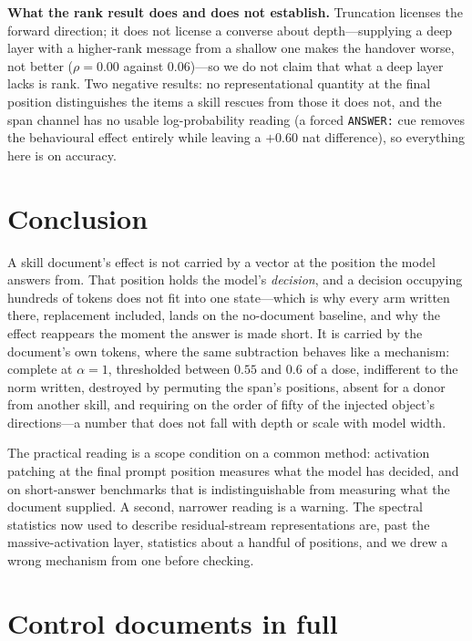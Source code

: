 \documentclass{article}
\begin{document}
\textbf{What the rank result does and does not establish.} Truncation licenses
the forward direction; it does not license a converse about depth---supplying a
deep layer with a higher-rank message from a shallow one makes the handover
worse, not better ($\rho=0.00$ against $0.06$)---so we do not claim that what a
deep layer lacks is rank. Two negative results: no representational quantity at
the final position distinguishes the items a skill rescues from those it does
not, and the span channel has no usable log-probability reading (a forced
\texttt{ANSWER:} cue removes the behavioural effect entirely while leaving a
$+0.60$ nat difference), so everything here is on accuracy.

\section{Conclusion}

A skill document's effect is not carried by a vector at the position the model
answers from. That position holds the model's \emph{decision}, and a decision
occupying hundreds of tokens does not fit into one state---which is why every
arm written there, replacement included, lands on the no-document baseline, and
why the effect reappears the moment the answer is made short. It is carried by
the document's own tokens, where the same subtraction behaves like a mechanism:
complete at $\alpha=1$, thresholded between $0.55$ and $0.6$ of a dose,
indifferent to the norm written, destroyed by permuting the span's positions,
absent for a donor from another skill, and requiring on the order of fifty of
the injected object's directions---a number that does not fall with depth or
scale with model width.

The practical reading is a scope condition on a common method: activation
patching at the final prompt position measures what the model has decided, and
on short-answer benchmarks that is indistinguishable from measuring what the
document supplied. A second, narrower reading is a warning. The spectral
statistics now used to describe residual-stream representations are, past the
massive-activation layer, statistics about a handful of positions, and we drew a
wrong mechanism from one before checking.

\label{endmain}
\clearpage



\clearpage
\appendix

\section{Control documents in full}
\label{app:controls}
\end{document}

